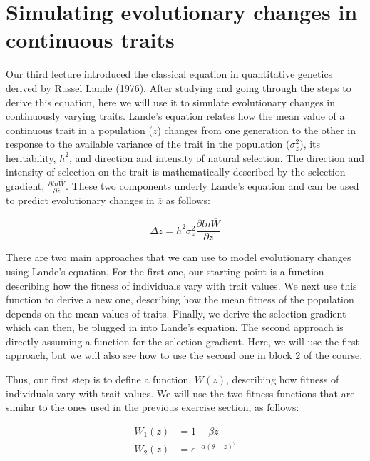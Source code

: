 \documentclass[
]{book}
\begin{document}
\hypertarget{simulating-evolutionary-changes-in-continuous-traits}{%
\section{Simulating evolutionary changes in continuous traits}\label{simulating-evolutionary-changes-in-continuous-traits}}

Our third lecture introduced the classical equation in quantitative genetics derived by \href{https://onlinelibrary.wiley.com/doi/10.1111/j.1558-5646.1976.tb00911.x}{Russel Lande (1976)}. After studying and going through the steps to derive this equation, here we will use it to simulate evolutionary changes in continuously varying traits. Lande's equation relates how the mean value of a continuous trait in a population (\(\overline{z}\)) changes from one generation to the other in response to the available variance of the trait in the population (\(\sigma^{2}_{z}\)), its heritability, \(h^2\), and direction and intensity of natural selection. The direction and intensity of selection on the trait is mathematically described by the selection gradient, \(\frac{\partial ln\overline{W}}{\partial \overline{z}}\). These two components underly Lande's equation and can be used to predict evolutionary changes in \(\overline{z}\) as follows:

\[
\Delta \overline{z}=h^2 \sigma^{2}_{z}\frac{\partial ln\overline{W}}{\partial \overline{z}}
\]

There are two main approaches that we can use to model evolutionary changes using Lande's equation. For the first one, our starting point is a function describing how the fitness of individuals vary with trait values. We next use this function to derive a new one, describing how the mean fitness of the population depends on the mean values of traits. Finally, we derive the selection gradient which can then, be plugged in into Lande's equation. The second approach is directly assuming a function for the selection gradient. Here, we will use the first approach, but we will also see how to use the second one in block 2 of the course.

Thus, our first step is to define a function, \(W(z)\), describing how fitness of individuals vary with trait values. We will use the two fitness functions that are similar to the ones used in the previous exercise section, as follows:

\[\begin{align}
W_{1}(z) &= 1+\beta z \\
W_{2}(z) &= e^{-\alpha\left(\theta-z\right)^2}
\end{align}\]
\end{document}
